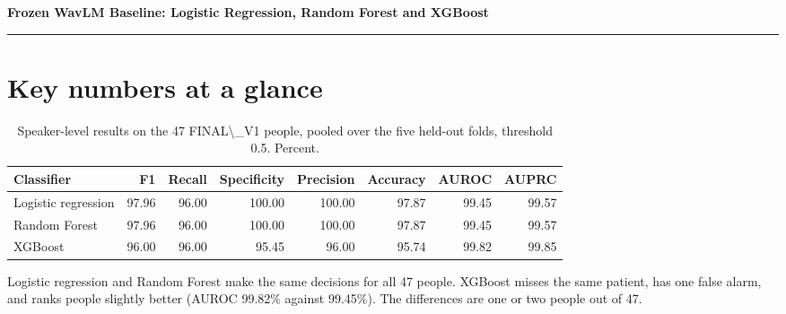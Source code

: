 \documentclass[11pt,a4paper]{article}
\begin{document}
\begin{center}{\LARGE\bfseries Frozen WavLM Baseline: Logistic Regression, Random Forest and XGBoost\par}\vspace{6pt}{\large Baseline subset of the FINAL\_V1 comparison (CSE 431, topic 4a)\par}\vspace{6pt}{\small Arannamoy Mondal. Evidence: frozen protocol FINAL\_V1, 47 people, 785 recordings, five speaker-disjoint folds.\par}\end{center}
\vspace{4pt}\hrule\vspace{6pt}
\tableofcontents
\newpage
\section*{Key numbers at a glance}
\begin{table}[H]\centering\footnotesize\renewcommand{\arraystretch}{1.15}
\caption{Speaker-level results on the 47 FINAL\textbackslash{}\_V1 people, pooled over the five held-out folds, threshold 0.5. Percent.}
\begin{tabular}{lrrrrrrr}
\toprule
\textbf{Classifier} & \textbf{F1} & \textbf{Recall} & \textbf{Specificity} & \textbf{Precision} & \textbf{Accuracy} & \textbf{AUROC} & \textbf{AUPRC}\\
\midrule
Logistic regression & 97.96 & 96.00 & 100.00 & 100.00 & 97.87 & 99.45 & 99.57\\
Random Forest & 97.96 & 96.00 & 100.00 & 100.00 & 97.87 & 99.45 & 99.57\\
XGBoost & 96.00 & 96.00 & 95.45 & 96.00 & 95.74 & 99.82 & 99.85\\
\bottomrule
\end{tabular}\end{table}
\begin{tcolorbox}[colback=orange!5,colframe=orange!70!black,boxrule=0.5pt,arc=2pt,left=5pt,right=5pt,top=3pt,bottom=3pt,title={\small\bfseries Key point}]\small Logistic regression and Random Forest make the same decisions for all 47 people. XGBoost misses the same patient, has one false alarm, and ranks people slightly better (AUROC 99.82\% against 99.45\%). The differences are one or two people out of 47.\end{tcolorbox}
\end{document}
